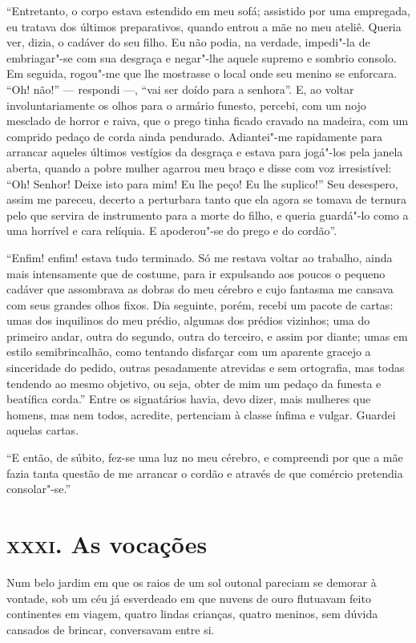 “Entretanto, o corpo estava estendido em meu sofá; assistido 
por uma empregada, eu tratava dos últimos preparativos, quando
entrou a mãe no meu ateliê. Queria ver, dizia, o cadáver do seu
filho. Eu não podia, na verdade, impedi"-la de embriagar"-se com sua
desgraça e negar"-lhe aquele supremo e sombrio consolo. Em seguida,
rogou"-me que lhe mostrasse o local onde seu menino se
enforcara. “Oh! não!'' --- respondi ---, “vai ser doído
para a senhora''. E, ao voltar involuntariamente os olhos
para o armário funesto, percebi, com um nojo mesclado de horror e
raiva, que o prego tinha ficado cravado na madeira, com um comprido
pedaço de corda ainda pendurado. Adiantei"-me rapidamente para arrancar
aqueles últimos vestígios da desgraça e estava para jogá"-los 
pela janela aberta, quando a pobre mulher agarrou meu braço e disse com voz
irresistível: “Oh! Senhor! Deixe isto para mim! Eu lhe peço! Eu
lhe suplico!” Seu desespero, assim me pareceu, decerto a
perturbara tanto que ela agora se tomava de ternura pelo que 
servira de instrumento para
a morte do filho, e queria guardá"-lo
como a uma horrível e cara relíquia. E apoderou"-se do prego e
do cordão''.

“Enfim! enfim! estava tudo terminado. Só me restava voltar
ao trabalho, ainda mais intensamente que de costume, para ir expulsando
aos poucos o pequeno cadáver que assombrava as dobras do meu cérebro
e cujo fantasma me cansava com seus grandes olhos fixos. Dia
seguinte, porém, recebi um pacote de cartas: umas dos inquilinos do meu prédio,
algumas dos prédios vizinhos; uma do primeiro andar, outra do
segundo, outra do terceiro, e assim por diante; umas em estilo
semibrincalhão, como tentando disfarçar com um aparente gracejo a
sinceridade do pedido, outras pesadamente atrevidas e sem ortografia,
mas todas tendendo ao mesmo objetivo, ou seja, obter de mim um pedaço
da funesta e beatífica corda.'' Entre os signatários havia, devo dizer, mais mulheres que homens,
mas nem todos, acredite, pertenciam à classe ínfima e vulgar.
Guardei aquelas cartas.

“E então, de súbito, fez-se uma luz no meu cérebro, e
compreendi por que a mãe fazia tanta questão de me arrancar o cordão e
através de que comércio pretendia consolar"-se.''

\chapter{\textsc{xxxi.} As vocações}

Num belo jardim em que os raios de um sol outonal pareciam se demorar à
vontade, sob um céu já esverdeado em que nuvens de ouro flutuavam feito
continentes em viagem, quatro lindas crianças, quatro meninos, sem
dúvida cansados de brincar, conversavam entre si.

